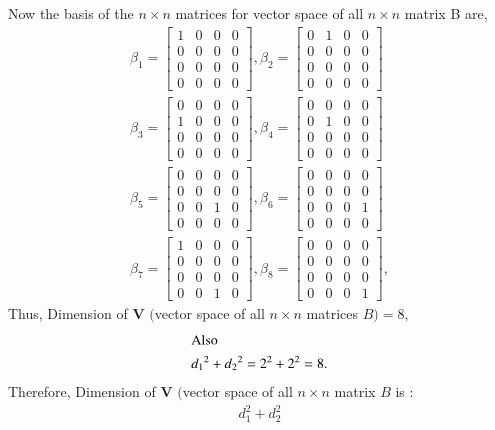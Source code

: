 \documentclass[journal,12pt,twocolumn]{IEEEtran}
\begin{document}
Now the basis of the $n \times n $  matrices for vector space of all $n \times n$ matrix B are,
\begin{align}
\beta_1 =  \begin{bmatrix}
1 & 0  & 0 & 0 \\ 
0 & 0  & 0 & 0  \\
0 & 0  & 0 & 0  \\
0 & 0  & 0 & 0    
\end{bmatrix},
 \beta_2 =  \begin{bmatrix}
0 & 1  & 0 & 0 \\ 
0 & 0  & 0 & 0  \\
0 & 0  & 0 & 0  \\
0 & 0  & 0 & 0    
\end{bmatrix}\\
\beta_3 =  \begin{bmatrix}
0 & 0  & 0 & 0 \\ 
1 & 0  & 0 & 0  \\
0 & 0  & 0 & 0  \\
0 & 0  & 0 & 0    
\end{bmatrix},
\beta_4 =  \begin{bmatrix}
0 & 0  & 0 & 0 \\ 
0 & 1  & 0 & 0  \\
0 & 0  & 0 & 0  \\
0 & 0  & 0 & 0    
\end{bmatrix}\\
\beta_5 =  \begin{bmatrix}
0 & 0  & 0 & 0 \\ 
0 & 0  & 0 & 0  \\
0 & 0  & 1 & 0  \\
0 & 0  & 0 & 0    
\end{bmatrix},
\beta_6 =  \begin{bmatrix}
0 & 0  & 0 & 0 \\ 
0 & 0  & 0 & 0  \\
0 & 0  & 0 & 1  \\
0 & 0  & 0 & 0    
\end{bmatrix}\\
\beta_7 =  \begin{bmatrix}
1 & 0  & 0 & 0 \\ 
0 & 0  & 0 & 0  \\
0 & 0  & 0 & 0  \\
0 & 0  & 1 & 0    
\end{bmatrix},
\beta_8 =  \begin{bmatrix}
0 & 0  & 0 & 0 \\ 
0 & 0  & 0 & 0  \\
0 & 0  & 0 & 0  \\
0 & 0  & 0 & 1    
\end{bmatrix},
\end{align}
Thus, Dimension of $\mathbf{V}$ $($vector space of all $n \times n$ matrices $ B ) = 8,$
\begin{align}
\intertext{Also}
 {d_1}^{2} + d{_2}^2 = 2^{2}+2^{2} = 8. 
 \end{align}
Therefore, Dimension of $\mathbf{V}$ $($vector space of all $ n \times n$ matrix $B$ is :
\begin{align}
 d_1^2+d_2^2
 \end{align}
\end{document}
